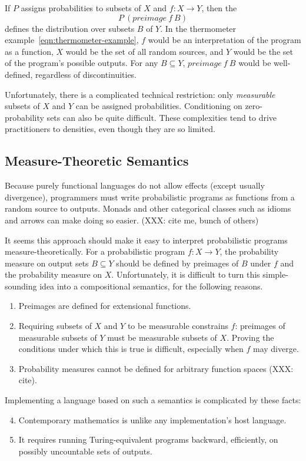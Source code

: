 \documentclass[preprint]{sigplanconf}
\begin{document}
If $P$ assigns probabilities to subsets of $X$ and $f : X \to Y$, then the 
\begin{equation}
	P~(preimage~f~B)
\end{equation}
defines the distribution over subsets $B$ of $Y$.
In the thermometer example~\eqref{eqn:thermometer-example}, $f$ would be an interpretation of the program as a function, $X$ would be the set of all random sources, and $Y$ would be the set of the program's possible outputs.
For any $B \subseteq Y$, $preimage~f~B$ would be well-defined, regardless of discontinuities.

Unfortunately, there is a complicated technical restriction: only \emph{measurable} subsets of $X$ and $Y$ can be assigned probabilities.
Conditioning on zero-probability sets can also be quite difficult.
These complexities tend to drive practitioners to densities, even though they are so limited.

\subsection{Measure-Theoretic Semantics}

Because purely functional languages do not allow effects (except usually divergence), programmers must write probabilistic programs as functions from a random source to outputs.
Monads and other categorical classes such as idioms and arrows can make doing so easier. (XXX: cite me, bunch of others)

It seems this approach should make it easy to interpret probabilistic programs measure-theoretically.
For a probabilistic program $f : X \to Y$, the probability measure on output sets $B \subseteq Y$ should be defined by preimages of $B$ under $f$ and the probability measure on $X$.
Unfortunately, it is difficult to turn this simple-sounding idea into a compositional semantics, for the following reasons.
\begin{enumerate}
	\item Preimages are defined for extensional functions. \label{problem:observable-domain}
	\item Requiring subsets of $X$ and $Y$ to be measurable constrains $f$: preimages of measurable subsets of $Y$ must be measurable subsets of $X$. Proving the conditions under which this is true is difficult, especially when $f$ may diverge. \label{problem:measurability}
	\item Probability measures cannot be defined for arbitrary function spaces (XXX: cite). \label{problem:higher-orderness}
\end{enumerate}
Implementing a language based on such a semantics is complicated by these facts:
\begin{enumerate}
	\setcounter{enumi}{3}
	\item Contemporary mathematics is unlike any implementation's host language. \label{problem:different-language}
	\item It requires running Turing-equivalent programs backward, efficiently, on possibly uncountable sets of outputs.\label{problem:backward-efficient}
\end{enumerate}
\end{document}
